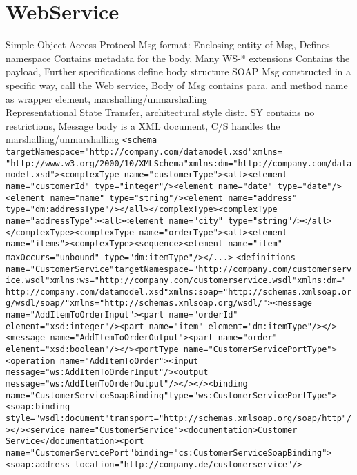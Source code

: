 \section{WebService}
Simple Object Access Protocol
Msg format: 
Enclosing entity of Msg, Defines namespace
Contains metadata for the body, 
Many WS-* extensions
Contains the payload, 
Further specifications define body structure
SOAP Msg constructed in a specific way, 
call the Web service, 
Body of Msg contains para. and method name 
as wrapper element,
marshalling/unmarshalling
\\
Representational State Transfer,
architectural style distr. SY
\textbar contains no restrictions, Message body is a XML document, C/S handles the marshalling/unmarshalling
\lstinline{<schema targetNamespace="http://company.com/datamodel.xsd"xmlns= "http://www.w3.org/2000/10/XMLSchema"xmlns:dm="http://company.com/datamodel.xsd"><complexType name="customerType"><all><element name="customerId" type="integer"/><element name="date" type="date"/><element name="name" type="string"/><element name="address" type="dm:addressType"/></all></complexType><complexType name="addressType"><all><element name="city" type="string"/></all></complexType><complexType name="orderType"><all><element name="items"><complexType><sequence><element name="item" maxOccurs="unbound" type="dm:itemType"/></...>}
\lstinline{<definitions name="CustomerService"targetNamespace="http://company.com/customerservice.wsdl"xmlns:ws="http://company.com/customerservice.wsdl"xmlns:dm=" http://company.com/datamodel.xsd"xmlns:soap="http://schemas.xmlsoap.org/wsdl/soap/"xmlns="http://schemas.xmlsoap.org/wsdl/"><message name="AddItemToOrderInput"><part name="orderId" element="xsd:integer"/><part name="item" element="dm:itemType"/></><message name="AddItemToOrderOutput"><part name="order" element="xsd:boolean"/></><portType name="CustomerServicePortType"><operation name="AddItemToOrder"><input message="ws:AddItemToOrderInput"/><output message="ws:AddItemToOrderOutput"/></></><binding name="CustomerServiceSoapBinding"type="ws:CustomerServicePortType"><soap:binding style="wsdl:document"transport="http://schemas.xmlsoap.org/soap/http"/></><service name="CustomerService"><documentation>Customer Service</documentation><port name="CustomerServicePort"binding="cs:CustomerServiceSoapBinding"><soap:address location="http://company.de/customerservice"/>}
